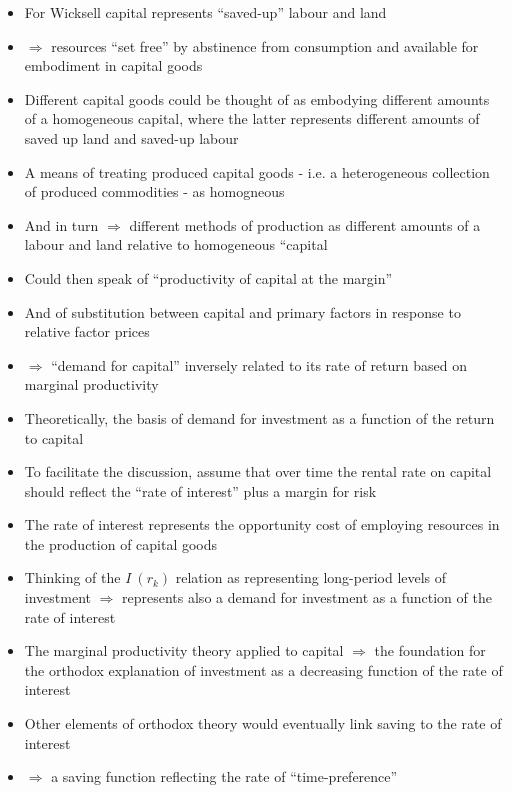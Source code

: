 \documentclass[a4paper,twoside]{article}
\numberwithin{equation}{section}
\numberwithin{figure}{section}
\begin{document}
\begin{itemize}
		\item For Wicksell capital represents ``saved-up'' labour and land
		\item \( \Rightarrow \) resources ``set free'' by abstinence from consumption and available for embodiment in capital goods
		\item Different capital goods could be thought of as embodying different amounts of a homogeneous capital, where the latter represents different amounts of saved up land and saved-up labour
		\item A means of treating produced capital goods - i.e. a heterogeneous collection of produced commodities  - as homogneous
		\item And in turn \( \Rightarrow \) different methods of production as different amounts of a labour and land relative to homogeneous ``capital
		\item Could then speak of ``productivity of capital at the margin''
		\item And of substitution between capital and primary factors in response to relative factor prices
		\item \( \Rightarrow \) ``demand for capital'' inversely related to its rate of return based on marginal productivity
		\item Theoretically, the basis of demand for investment as a function of the return to capital 
		\item To facilitate the discussion, assume that over time the rental rate on capital should reflect the ``rate of interest'' plus a margin for risk
		\item The rate of interest represents the opportunity cost of employing resources in the production of capital goods
		\item Thinking of the \( I\:(r_k) \) relation as representing long-period levels of investment \( \Rightarrow \) represents also a demand for investment as a function of the rate of interest
		\item The marginal productivity theory applied to capital \( \Rightarrow \) the foundation for the orthodox explanation of investment as a decreasing function of the rate of interest
		\item Other elements of orthodox theory would eventually link saving to the rate of interest
		\item \( \Rightarrow \) a saving function reflecting the rate of ``time-preference''
		\begin{figure}[H]
			\centering
			\begin{tikzpicture}[scale=0.55]

\end{tikzpicture}
\end{figure}
\end{itemize}
\end{document}
